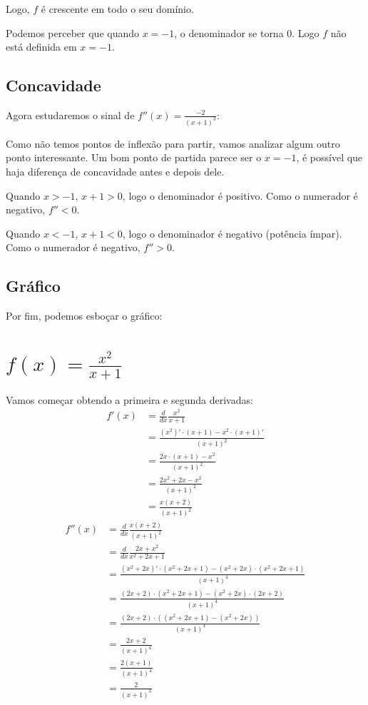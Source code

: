 \documentclass[12pt]{article}
\theoremstyle{definition}
\begin{document}
Logo, \(f\) é crescente em todo o seu domínio.

Podemos perceber que quando \(x = -1\), o denominador se torna \(0\). Logo \(f\) não está definida em \(x = -1\).
\subsection{Concavidade}
Agora estudaremos o sinal de \(f''(x) = \frac{-2}{{(x+1)}^3}\):

Como não temos pontos de inflexão para partir, vamos analizar algum outro ponto interessante. Um bom ponto de partida parece ser o \(x = -1\), é possível que haja diferença de concavidade antes e depois dele.

Quando \( x > -1\), \(x+1 > 0\), logo o denominador é positivo. Como o numerador é negativo, \(f'' < 0\).

Quando \( x < -1\), \(x+1 < 0\), logo o denominador é negativo (potência ímpar). Como o numerador é negativo, \(f'' > 0\).
\subsection{Gráfico}
Por fim, podemos esboçar o gráfico:


\section{\(f(x) = \frac{x^2}{x+1}\)}
Vamos começar obtendo a primeira e segunda derivadas:
\begin{align*}
    f'(x)
    &= \frac{d}{dx} \frac{x^2}{x+1} \\
    &= \frac{(x^2)'\cdot(x+1)-x^2\cdot(x+1)'}{{(x+1)}^2} \\
    &= \frac{2x\cdot(x+1)-x^2}{{(x+1)}^2} \\
    &= \frac{2x^2+2x-x^2}{{(x+1)}^2} \\
    &= \frac{x(x+2)}{{(x+1)}^2} 
\end{align*}
\begin{align*}
    f''(x)
    &= \frac{d}{dx} \frac{x(x+2)}{{(x+1)}^2} \\
    &= \frac{d}{dx} \frac{2x+x^2}{x^2+2x+1} \\
    &= \frac{(x^2+2x)'\cdot(x^2+2x+1)-(x^2+2x)\cdot(x^2+2x+1)}{{(x+1)}^4} \\
    &= \frac{(2x+2)\cdot(x^2+2x+1)-(x^2+2x)\cdot(2x+2)}{{(x+1)}^4} \\
    &= \frac{(2x+2)\cdot((x^2+2x+1)-(x^2+2x))}{{(x+1)}^4} \\
    &= \frac{2x+2}{{(x+1)}^4} \\
    &= \frac{2(x+1)}{{(x+1)}^4} \\
    &= \frac{2}{{(x+1)}^3}
\end{align*}
\end{document}
